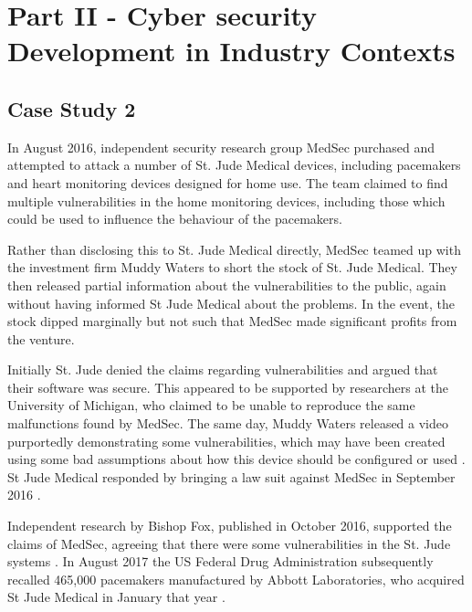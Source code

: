 \documentclass{svjour3}                     %
\begin{document}
\section{Part II - Cyber security Development in Industry Contexts }
\label{sec:practice}
\subsection{Case Study 2}
\label{sec:case2}
In August 2016, independent security research group MedSec purchased and attempted to attack a number of St. Jude Medical devices, including pacemakers and heart monitoring devices designed for home use. The team claimed to find multiple vulnerabilities in the home monitoring devices, including those which could be used to influence the behaviour of the pacemakers.

Rather than disclosing this to St. Jude Medical directly, MedSec teamed up with the investment firm Muddy Waters to short the stock of St. Jude Medical. They then released partial information about the vulnerabilities to the public, again without having informed St Jude Medical about the problems.  In the event, the stock dipped marginally but not such that MedSec made significant profits from the venture.

Initially St. Jude denied the claims regarding vulnerabilities and argued that their software was secure. This appeared to be supported by researchers at the University of Michigan, who claimed to be unable to reproduce the same malfunctions found by MedSec. The same day, Muddy Waters released a video purportedly demonstrating some vulnerabilities, which may have been created using some bad assumptions about how this device should be configured or used \cite{spring16medsec}. St Jude Medical responded by bringing a law suit against MedSec in September 2016 \cite{weigelt16jude,nichols16jude}.

Independent research by Bishop Fox, published in October 2016, supported the claims of MedSec, agreeing that there were some vulnerabilities in the St. Jude systems \cite{livitt2016prelim}. In August 2017 the US Federal Drug Administration subsequently recalled 465,000 pacemakers manufactured by Abbott Laboratories, who acquired St Jude Medical in January that year \cite{spring16medsec}.
\end{document}
